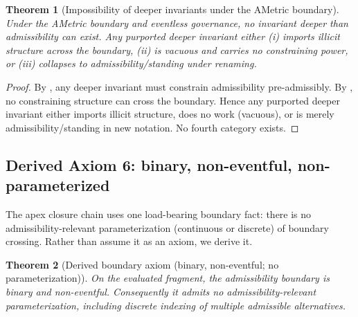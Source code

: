\documentclass[11pt]{article}
\newtheorem{theorem}{Theorem}[section]
\theoremstyle{definition}
\begin{document}
\begin{theorem}[Impossibility of deeper invariants under the AMetric boundary]
\label{thm:no-deeper-invariants}
Under the AMetric boundary and eventless governance, no invariant deeper than admissibility can exist.
Any purported deeper invariant either (i) imports illicit structure across the boundary, (ii) is vacuous and carries no constraining power, or (iii) collapses to admissibility/standing under renaming.
\end{theorem}

\begin{proof}
By , any deeper invariant must constrain admissibility pre-admissibly.
By , no constraining structure can cross the boundary.
Hence any purported deeper invariant either imports illicit structure, does no work (vacuous), or is merely admissibility/standing in new notation.
No fourth category exists.
\end{proof}

\subsection{Derived Axiom 6: binary, non-eventful, non-parameterized}

The apex closure chain uses one load-bearing boundary fact:
there is no admissibility-relevant parameterization (continuous or discrete) of boundary crossing.
Rather than assume it as an axiom, we derive it.

\begin{theorem}[Derived boundary axiom (binary, non-eventful; no parameterization)]
\label{thm:derived-A6}
On the evaluated fragment, the admissibility boundary is binary and non-eventful.
Consequently it admits no admissibility-relevant parameterization, including discrete indexing of multiple admissible alternatives.
\end{theorem}
\end{document}
